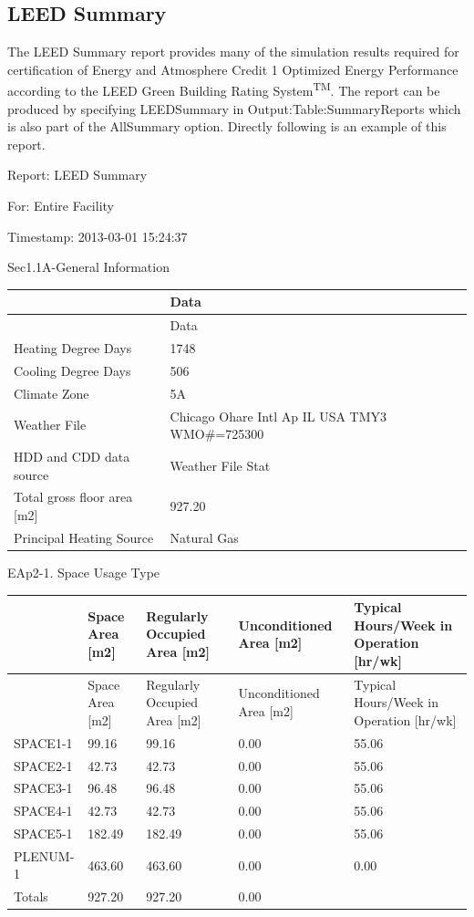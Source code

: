 \subsection{LEED Summary}\label{leed-summary}

The LEED Summary report provides many of the simulation results required for certification of Energy and Atmosphere Credit 1 Optimized Energy Performance according to the LEED Green Building Rating System\textsuperscript{TM}. The report can be produced by specifying LEEDSummary in Output:Table:SummaryReports which is also part of the AllSummary option. Directly following is an example of this report.

Report: LEED Summary

For: Entire Facility

Timestamp: 2013-03-01 15:24:37

Sec1.1A-General Information

\begin{longtable}[c]{>{\raggedright}p{2.21in}>{\raggedright}p{3.78in}}
\toprule
 & Data \tabularnewline
\midrule
\endfirsthead

\toprule
 & Data \tabularnewline
\midrule
\endhead

Heating Degree Days & 1748 \tabularnewline
Cooling Degree Days & 506 \tabularnewline
Climate Zone & 5A \tabularnewline
Weather File & Chicago Ohare Intl Ap IL USA TMY3 WMO\#=725300 \tabularnewline
HDD and CDD data source & Weather File Stat \tabularnewline
Total gross floor area [m2] & 927.20 \tabularnewline
Principal Heating Source & Natural Gas \tabularnewline
\bottomrule
\end{longtable}

EAp2-1. Space Usage Type

\begin{longtable}[c]{>{\raggedright}p{1.2in}>{\raggedright}p{1.2in}>{\raggedright}p{1.2in}>{\raggedright}p{1.2in}>{\raggedright}p{1.2in}}
\toprule
 & Space Area [m2] & Regularly Occupied Area [m2] & Unconditioned Area [m2] & Typical Hours/Week in Operation [hr/wk] \tabularnewline
\midrule
\endfirsthead

\toprule
 & Space Area [m2] & Regularly Occupied Area [m2] & Unconditioned Area [m2] & Typical Hours/Week in Operation [hr/wk] \tabularnewline
\midrule
\endhead

SPACE1-1 & 99.16 & 99.16 & 0.00 & 55.06 \tabularnewline
SPACE2-1 & 42.73 & 42.73 & 0.00 & 55.06 \tabularnewline
SPACE3-1 & 96.48 & 96.48 & 0.00 & 55.06 \tabularnewline
SPACE4-1 & 42.73 & 42.73 & 0.00 & 55.06 \tabularnewline
SPACE5-1 & 182.49 & 182.49 & 0.00 & 55.06 \tabularnewline
PLENUM-1 & 463.60 & 463.60 & 0.00 & 0.00 \tabularnewline
Totals & 927.20 & 927.20 & 0.00 & ~ \tabularnewline
\bottomrule
\end{longtable}

